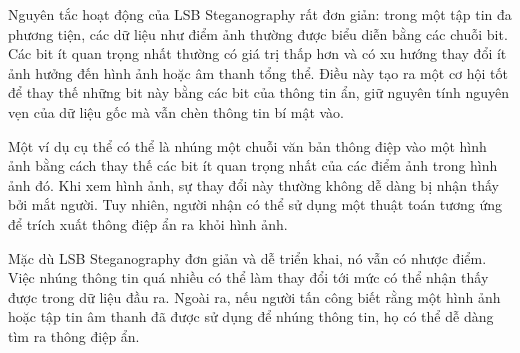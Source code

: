 Nguyên tắc hoạt động của LSB Steganography rất đơn giản: trong một tập tin đa phương tiện, các dữ liệu như điểm ảnh thường được biểu diễn bằng các chuỗi bit. Các bit ít quan trọng nhất thường có giá trị thấp hơn và có xu hướng thay đổi ít ảnh hưởng đến hình ảnh hoặc âm thanh tổng thể. Điều này tạo ra một cơ hội tốt để thay thế những bit này bằng các bit của thông tin ẩn, giữ nguyên tính nguyên vẹn của dữ liệu gốc mà vẫn chèn thông tin bí mật vào.

Một ví dụ cụ thể có thể là nhúng một chuỗi văn bản thông điệp vào một hình ảnh bằng cách thay thế các bit ít quan trọng nhất của các điểm ảnh trong hình ảnh đó. Khi xem hình ảnh, sự thay đổi này thường không dễ dàng bị nhận thấy bởi mắt người. Tuy nhiên, người nhận có thể sử dụng một thuật toán tương ứng để trích xuất thông điệp ẩn ra khỏi hình ảnh.

Mặc dù LSB Steganography đơn giản và dễ triển khai, nó vẫn có nhược điểm. Việc nhúng thông tin quá nhiều có thể làm thay đổi tới mức có thể nhận thấy được trong dữ liệu đầu ra. Ngoài ra, nếu người tấn công biết rằng một hình ảnh hoặc tập tin âm thanh đã được sử dụng để nhúng thông tin, họ có thể dễ dàng tìm ra thông điệp ẩn.